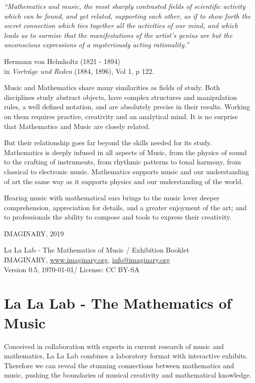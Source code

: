 \epigraph{ \itshape ``Mathematics and music, the most sharply contrasted fields of scientific activity which can be found, and yet related, supporting each other, as if to show forth the secret connection which ties together all the activities of our mind, and which leads us to surmise that the  manifestations of the artist's genius are but the unconscious expressions of a mysteriously acting rationality.''
}
{\vspace{0.5em}Hermann von Helmholtz (1821 - 1894) \\
in \textit{Vorträge und Reden} (1884, 1896), Vol 1, p 122.}


Music and Mathematics share many similarities as fields of study. Both disciplines study abstract objects, have complex structures and manipulation rules, a well defined notation, and are absolutely precise in their results. Working on them requires practice, creativity and an analytical mind. It is no surprise that Mathematics and Music are closely related.

But their relationship goes far beyond the skills needed for its study. Mathematics is deeply infused in all aspects of Music, from the physics of sound to the crafting of instruments, from rhythmic patterns to tonal harmony, from classical to electronic music. Mathematics supports music and our understanding of art the same way as it supports physics and our understanding of the world. 

Hearing music with mathematical ears brings to the music lover deeper comprehension, appreciation for details, and a greater enjoyment of the art; and to professionals the ability to compose and tools to express their creativity.

\begin{flushright}
IMAGINARY, 2019
\end{flushright}

\vfill
La La Lab - The Mathematics of Music / Exhibition Booklet \\
IMAGINARY, \url{www.imaginary.org}, \href{mailto:info@imaginary.org}{info@imaginary.org} \\
Version 0.5, \today / License: CC BY-SA


\section*{La La Lab - The Mathematics of Music}

Conceived in collaboration with experts in current research of music and mathematics, La La Lab combines a laboratory format with interactive exhibits. Therefore we can reveal the stunning connections between mathematics and music, pushing the boundaries of musical creativity and mathematical knowledge.

